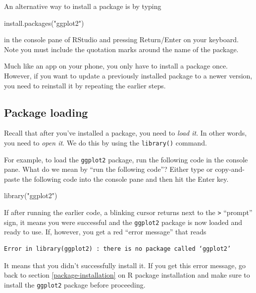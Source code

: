 \documentclass[
  12pt,
  oneside]{book}
\newenvironment{Shaded}{\begin{snugshade}}{\end{snugshade}}
\newcommand{\FunctionTok}[1]{\textcolor[rgb]{0.00,0.00,0.00}{#1}}
\newcommand{\NormalTok}[1]{#1}
\newcommand{\StringTok}[1]{\textcolor[rgb]{0.31,0.60,0.02}{#1}}
\theoremstyle{definition}
\theoremstyle{definition}
\theoremstyle{definition}
\theoremstyle{definition}
\theoremstyle{remark}
\begin{document}
An alternative way to install a package is by typing

\begin{Shaded}
\begin{Highlighting}[]
\FunctionTok{install.packages}\NormalTok{(}\StringTok{"ggplot2"}\NormalTok{)}
\end{Highlighting}
\end{Shaded}

in the console pane of RStudio and pressing Return/Enter on your keyboard. Note you must include the quotation marks around the name of the package.

Much like an app on your phone, you only have to install a package once. However, if you want to update a previously installed package to a newer version, you need to reinstall it by repeating the earlier steps.

\hypertarget{package-loading}{%
\subsection{Package loading}\label{package-loading}}

Recall that after you've installed a package, you need to \emph{load it}. In other words, you need to \emph{open it}. We do this by using the \texttt{library()} command. 

For example, to load the \texttt{ggplot2} package, run the following code in the console pane. What do we mean by ``run the following code''? Either type or copy-and-paste the following code into the console pane and then hit the Enter key.

\begin{Shaded}
\begin{Highlighting}[]
\FunctionTok{library}\NormalTok{(}\StringTok{"ggplot2"}\NormalTok{)}
\end{Highlighting}
\end{Shaded}

If after running the earlier code, a blinking cursor returns next to the \texttt{\textgreater{}} ``prompt'' sign, it means you were successful and the \texttt{ggplot2} package is now loaded and ready to use. If, however, you get a red ``error message'' that reads

\begin{verbatim}
Error in library(ggplot2) : there is no package called ‘ggplot2’
\end{verbatim}

It means that you didn't successfully install it. If you get this error message, go back to section \ref{package-installation} on R package installation and make sure to install the \texttt{ggplot2} package before proceeding.
\end{document}
